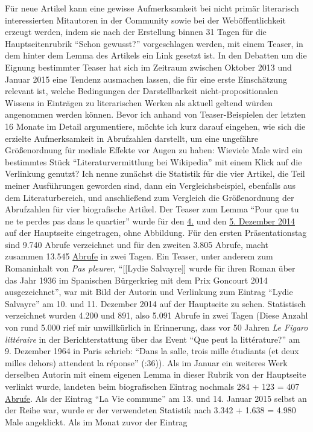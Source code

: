 \documentclass[fontsize=12pt]{scrartcl}
\begin{document}
F\"ur neue Artikel kann eine gewisse Aufmerksamkeit bei nicht prim\"ar li\-te\-ra\-risch interessierten Mitautoren\textsuperscript{\tiny *} in der Community sowie bei der Web\"of\-fent\-lichkeit erzeugt werden, indem sie nach der Erstellung binnen 31 Tagen f\"ur die Hauptsei\-tenrubrik "`Schon gewusst?"' vorgeschlagen werden, mit einem Tea\-ser, in dem hinter dem Lemma des Artikels ein Link gesetzt ist. In den Debatten um die Eignung bestimmter Tea\-ser hat sich im Zeitraum zwischen Oktober 2013 und Januar 2015 eine Tendenz ausmachen lassen, die f\"ur eine erste Einsch\"atzung relevant ist, welche Bedingungen der Darstellbarkeit nicht-pro\-po\-si\-ti\-o\-na\-len Wissens in Eintr\"agen zu li\-te\-ra\-rischen Werken als aktuell geltend w\"urden angenommen werden k\"onnen. Bevor ich anhand von Teaser-Beispielen der letzten 16 Monate im Detail argumentiere, m\"ochte ich kurz darauf eingehen, wie sich die erzielte Aufmerksamkeit in Abrufzahlen darstellt, um eine ungef\"ahre Gr\"o{\ss}enordnung f\"ur mediale Effekte vor Augen zu haben: Wieviele Male wird ein bestimmtes St\"uck "`Li\-te\-ra\-tur\-ver\-mitt\-lung bei Wi\-ki\-pe\-dia"' mit einem Klick auf die Verlinkung genutzt? Ich nenne zun\"achst die Statistik f\"ur die \mbox{vier} Artikel, die Teil meiner Ausf\"uh\-rungen geworden sind, dann ein Vergleichsbeispiel, ebenfalls aus dem Li\-te\-ra\-tur\-bereich, und anschlie{\ss}end zum Vergleich die Gr\"o{\ss}enordnung der Abrufzahlen f\"ur \mbox{vier} biografische Artikel. Der Teaser zum Lemma "`Pour que tu ne te perdes pas dans le quartier"' wurde f\"ur den \href{https://de.wikipedia.org/wiki/Wikipedia:Hauptseite/Archiv/4._Dezember_2014}{4.} und den \href{https://de.wikipedia.org/wiki/Wikipedia:Hauptseite/Archiv/5._Dezember_2014}{5. Dezember 2014} auf der Hauptseite eingetragen, ohne Abbildung. F\"ur den ersten Pr\"asentationstag sind 9.740 Abrufe verzeichnet und f\"ur den zwei\-ten 3.805 Abrufe, macht zusammen 13.545 \href{http://stats.grok.se/de/latest90/Pour_que_tu_ne_te_perdes_pas_dans_le_quartier}{Abrufe} in zwei Tagen. Ein Teaser, unter anderem zum Romaninhalt von \textit{Pas pleurer}, "`[[Lydie Salvayre]] wurde f\"ur ihren Roman \"uber das Jahr 1936 im Spanischen B\"urgerkrieg mit dem Prix Goncourt 2014 ausge\-zeich\-net"', war mit Bild der Autorin\textsuperscript{\tiny *} und Verlinkung zum Eintrag "`Lydie Salvayre"' am 10. und 11. Dezember 2014 auf der Hauptseite zu sehen. Statistisch verzeichnet wurden 4.200 und 891, also 5.091 Abrufe in zwei Tagen (Diese Anzahl von rund 5.000 rief mir unwillk\"urlich in Erinnerung, dass vor 50 Jahren \textit{Le Figaro litt\'{e}raire} in der Berichterstattung \"uber das Event "`Que peut la litt\'{e}rature?"' am 9. Dezember 1964 in Paris schrieb: "`Dans la salle, trois mille \'{e}tudiants (et deux milles dehors) attendent la r\'{e}ponse"' (\cite{Louette2014}:36)). Als im Januar ein weiteres Werk derselben Autorin\textsuperscript{\tiny *} mit einem eigenen Lemma in dieser Rubrik von der Hauptseite verlinkt wurde, landeten beim biografischen Eintrag nochmals 284 + 123 = 407 \href{http://stats.grok.se/de/latest90/Lydie_Salvayre}{Abrufe}. Als der Eintrag "`La Vie commune"' am 13. und 14. Ja\-nu\-ar 2015 \mbox{selbst} an der Reihe war, wurde er der verwendeten Statistik nach 3.342 + 1.638 = 4.980 Male angeklickt. Als im Monat zuvor der Eintrag 
\end{document}
